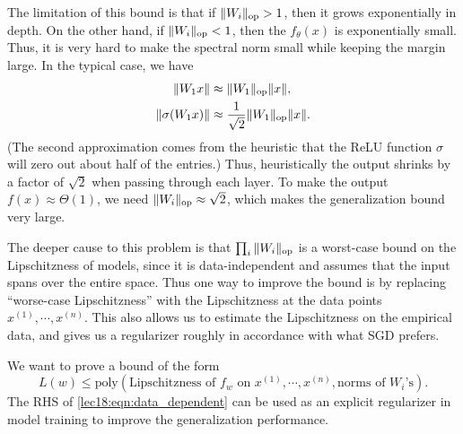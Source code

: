 The limitation of this bound is that if $\|W_i\|_{\textup{op}} >1$, then it grows exponentially in depth. On the other hand, if $\|W_i\|_{\textup{op}} < 1$, then the $f_\theta(x)$ is exponentially small. Thus, it is very hard to make the spectral norm small while keeping the margin large. In the typical case, we have
\begin{align}
    \|W_1x\| &\approx \|W_1\|_{\textup{op}}\|x\|, \\
    \|\sigma(W_1x)\| &\approx \frac{1}{\sqrt{2}}\|W_1\|_{\textup{op}}\|x\|.
\end{align}
(The second approximation comes from the heuristic that the ReLU function $\sigma$ will zero out about half of the entries.) Thus, heuristically the output shrinks by a factor of $\sqrt{2}$ when passing through each layer. To make the output $f(x)\approx \Theta(1)$, we need $\|W_i\|_{\textup{op}}\approx \sqrt{2}$, which makes the generalization bound very large. 

The deeper cause to this problem is that $\prod_i \|W_i\|_{\textup{op}}$ is a worst-case bound on the Lipschitzness of models, since it is data-independent and assumes that the input spans over the entire space. Thus one way to improve the bound is by replacing ``worse-case Lipschitzness'' with the Lipschitzness at the data points $x^{(1)}, \cdots, x^{(n)}$. This also allows us to estimate the Lipschitzness on the empirical data, and gives us a regularizer roughly in accordance with what SGD prefers.

We want to prove a bound of the form
\begin{equation}\label{lec18:eqn:data_dependent}
L(w)\leq \text{poly}(\text{Lipschitzness of $f_w$ on $x^{(1)}, \cdots, x^{(n)}$}, \text{norms of $W_i$'s}).
\end{equation}
The RHS of \eqref{lec18:eqn:data_dependent} can be used as an explicit regularizer in model training to improve the generalization performance. 

